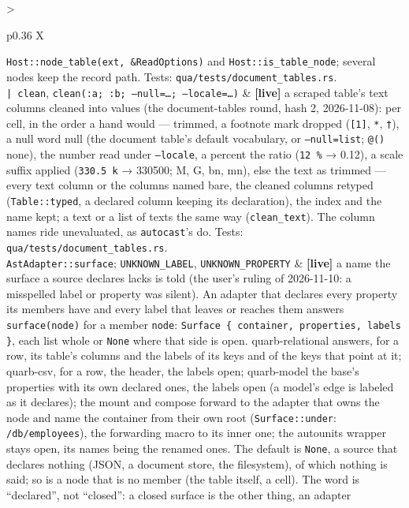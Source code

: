 \documentclass{report}
\newcommand{\live}{\textbf{\textcolor{blue!60!black}{[live]}}\xspace}
\begin{document}
\begin{xltabular}{\textwidth}{>{\raggedright\arraybackslash}p{0.36\textwidth} X}
    \texttt{Host::node\_table(ext, \&ReadOptions)} and
    \texttt{Host::is\_table\_node}; several nodes keep the record path.
    Tests: \texttt{qua/tests/document\_tables.rs}. \\
\texttt{| clean}, \texttt{clean(:a; :b; --null=…; --locale=…)}
  & \live a scraped table's text columns cleaned into values (the
    document-tables round, hash 2, 2026-11-08): per cell, in the
    order a hand would — trimmed, a footnote mark dropped
    (\texttt{[1]}, \texttt{*}, \texttt{†}), a null word null (the
    document table's default vocabulary, or \texttt{--null=list};
    \texttt{@()} none), the number read under \texttt{--locale}, a
    percent the ratio (\texttt{12 \%} → 0.12), a scale suffix applied
    (\texttt{330.5 k} → 330500; M, G, bn, mn), else the text as
    trimmed — every text column or the columns named bare, the
    cleaned columns retyped (\texttt{Table::typed}, a declared column
    keeping its declaration), the index and the name kept; a text or
    a list of texts the same way (\texttt{clean\_text}). The column
    names ride unevaluated, as \texttt{autocast}'s do. Tests:
    \texttt{qua/tests/document\_tables.rs}. \\
\texttt{AstAdapter::surface}; \texttt{UNKNOWN\_LABEL}, \texttt{UNKNOWN\_PROPERTY}
  & \live a name the surface a source declares lacks is told (the
    user's ruling of 2026-11-10: a misspelled label or property was
    silent). An adapter that declares every property its members
    have and every label that leaves or reaches them answers
    \texttt{surface(node)} for a member \texttt{node}: \texttt{Surface
    \{ container, properties, labels \}}, each list whole or
    \texttt{None} where that side is open. quarb-relational answers,
    for a row, its table's columns and the labels of its keys and of
    the keys that point at it; quarb-csv, for a row, the header, the
    labels open; quarb-model the base's properties with its own
    declared ones, the labels open (a model's edge is labeled as it
    declares); the mount and compose forward to the adapter that
    owns the node and name the container from their own root
    (\texttt{Surface::under}: \texttt{/db/employees}), the forwarding
    macro to its inner one; the autounits wrapper stays open, its
    names being the renamed ones. The default is \texttt{None}, a
    source that declares nothing (JSON, a document store, the
    filesystem), of which nothing is said; so is a node that is no
    member (the table itself, a cell). The word is ``declared'', not
    ``closed'': a closed surface is the other thing, an adapter

\end{xltabular}
\end{document}
